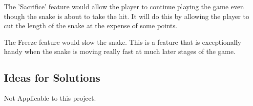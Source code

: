 \documentclass[12pt]{article}
\begin{document}
	The 'Sacrifice' feature would allow the player to continue playing the game even though the snake is about to take the hit. It will do this by allowing the player to cut the length of the snake at the expense of some points.

	The Freeze feature would slow the snake. This is a feature that is exceptionally handy when the snake is moving really fast at much later stages of the game.
\subsection{Ideas for Solutions}
	Not Applicable to this project.
\end{document}
